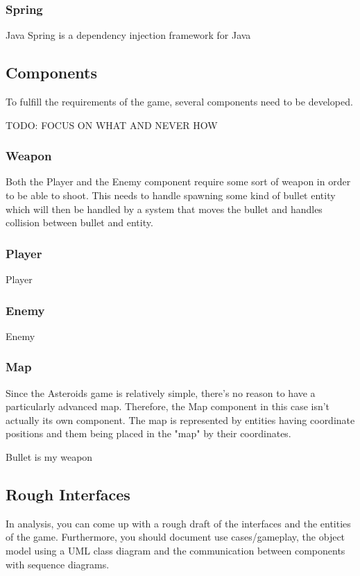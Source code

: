 \subsubsection{Spring}
Java Spring is a dependency injection framework for Java


\subsection{Components}
To fulfill the requirements of the game, several components need to be developed.

TODO: FOCUS ON WHAT AND NEVER HOW

\subsubsection{Weapon}
Both the Player and the Enemy component require some sort of weapon in order to be able to shoot. This needs to handle spawning some kind of bullet entity which will then be handled by a system that moves the bullet and handles collision between bullet and entity.

\subsubsection{Player}
Player

\subsubsection{Enemy}
Enemy

\subsubsection{Map}
Since the Asteroids game is relatively simple, there's no reason to have a particularly advanced map. Therefore, the Map component in this case isn't actually its own component. The map is represented by entities having coordinate positions and them being placed in the "map" by their coordinates.

Bullet is my weapon

\subsection{Rough Interfaces}
In analysis, you can come up with a rough draft of the interfaces and the entities of the game.
Furthermore, you should document use cases/gameplay, the object model using a UML class diagram and the communication between components with sequence diagrams.